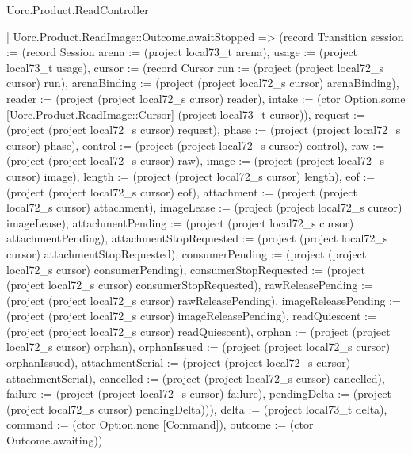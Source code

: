 \begin{lexlean}{Uorc.Product.ReadController}
\begin{semanticmodule}
{    | Uorc.Product.ReadImage::Outcome.awaitStopped => (record Transition {session := (record Session {arena := (project local73_t arena), usage := (project local73_t usage), cursor := (record Cursor {run := (project (project local72_s cursor) run), arenaBinding := (project (project local72_s cursor) arenaBinding), reader := (project (project local72_s cursor) reader), intake := (ctor Option.some [Uorc.Product.ReadImage::Cursor] (project local73_t cursor)), request := (project (project local72_s cursor) request), phase := (project (project local72_s cursor) phase), control := (project (project local72_s cursor) control), raw := (project (project local72_s cursor) raw), image := (project (project local72_s cursor) image), length := (project (project local72_s cursor) length), eof := (project (project local72_s cursor) eof), attachment := (project (project local72_s cursor) attachment), imageLease := (project (project local72_s cursor) imageLease), attachmentPending := (project (project local72_s cursor) attachmentPending), attachmentStopRequested := (project (project local72_s cursor) attachmentStopRequested), consumerPending := (project (project local72_s cursor) consumerPending), consumerStopRequested := (project (project local72_s cursor) consumerStopRequested), rawReleasePending := (project (project local72_s cursor) rawReleasePending), imageReleasePending := (project (project local72_s cursor) imageReleasePending), readQuiescent := (project (project local72_s cursor) readQuiescent), orphan := (project (project local72_s cursor) orphan), orphanIssued := (project (project local72_s cursor) orphanIssued), attachmentSerial := (project (project local72_s cursor) attachmentSerial), cancelled := (project (project local72_s cursor) cancelled), failure := (project (project local72_s cursor) failure), pendingDelta := (project (project local72_s cursor) pendingDelta)})}), delta := (project local73_t delta), command := (ctor Option.none [Command]), outcome := (ctor Outcome.awaiting)})
}
\end{semanticmodule}
\end{lexlean}
